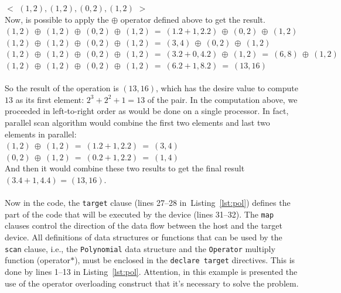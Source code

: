 \documentclass[Ingles]{ic-tese-v1}
\newcommand{\ttt}[1]{{\texttt{#1}}}
\newcommand{\rlst}[1]{Listing~\ref{lst:#1}}
\begin{document}
$<$ $(1, 2), (1, 2), (0, 2), (1, 2)$ $>$\\

Now, is possible to apply the $\oplus$ operator defined above to get the result.\\
$(1, 2)\:\oplus\:(1, 2)\:\oplus\:(0, 2)\:\oplus\:(1, 2)\:=\:(1 . 2 + 1, 2 . 2)\:\oplus\:(0, 2)\: \oplus\:(1, 2)$\\
$(1, 2)\:\oplus\:(1, 2)\:\oplus\:(0, 2)\:\oplus\:(1, 2)\:=\:(3, 4)\:\oplus\:(0, 2)\:\oplus\:(1, 2)$\\
$(1, 2)\:\oplus\:(1, 2)\:\oplus\:(0, 2)\:\oplus\:(1, 2)\:=\:(3. 2 + 0, 4 . 2)\:\oplus\:(1, 2)\:=\:(6, 8)\:\oplus\:(1, 2)$\\
$(1, 2)\:\oplus\:(1, 2)\:\oplus\:(0, 2)\:\oplus\:(1, 2)\:=\:(6 . 2 + 1, 8 . 2) \:=\:(13, 16)$\\\\
So the result of the operation is $(13, 16)$, which has the desire value to compute $13$
as its first element: $2^{3} + 2^{2} + 1 = 13$ of the pair.
In the computation above, we proceeded in left-to-right order as would be
done on a single processor. In fact, parallel scan algorithm would
combine the first two elements and last two elements in parallel:\\
$(1, 2) \:\oplus\: (1, 2) \:=\: (1 . 2 + 1, 2 . 2) \:=\: (3, 4)$\\
$(0, 2) \:\oplus\: (1, 2) \:=\: (0 . 2 + 1, 2 . 2) \:=\: (1, 4)$\\
And then it would combine these two results to get the final result $(3 . 4 + 1, 4 . 4)$
= $(13, 16)$.
\\\\
Now in the code, the \ttt{target} clause (lines 27--28 in~\rlst{pol}) defines the part of the code
that will  be  executed by  the device  (lines
31--32).  The \ttt{map} clauses control the direction  of the data flow
between the host and the target device. All definitions of data structures
or functions  that can be used  by the \ttt{scan} clause,  i.e., the
\ttt{Polynomial} data  structure and the \ttt{Operator}  multiply function
(operator$*$),  must   be  enclosed  in  the   \ttt{declare  target}
directives. This is done by lines 1--13 in \rlst{pol}.
Attention, in this example is presented the use of the operator overloading 
construct that it's necessary to solve the problem. 
\end{document}
